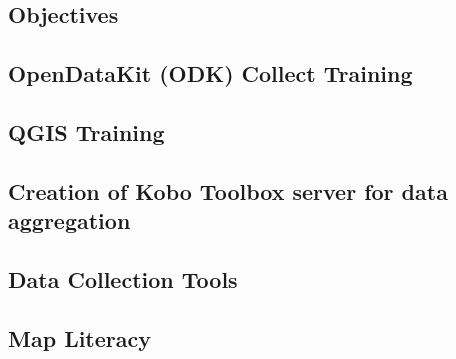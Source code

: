 \documentclass[a4paper,12pt,twoside]{article}
\begin{document}
\begin{multicols}{2}
\lipsum[0-5]
\end{multicols}

\subsection{Objectives}

\begin{multicols}{2}
\lipsum[0-5]
\end{multicols}

\subsection{OpenDataKit (ODK) Collect Training}

\begin{multicols}{2}
\lipsum[0-5]
\end{multicols}

\subsection{QGIS Training}

\begin{multicols}{2}
\lipsum[0-5]
\end{multicols}

\subsection{Creation of Kobo Toolbox  server for data aggregation}

\begin{multicols}{2}
\lipsum[0-5]
\end{multicols}
	
\subsection{Data Collection Tools}

\begin{multicols}{2}
\lipsum[0-5]
\end{multicols}

\subsection{Map Literacy}

\begin{multicols}{2}
\lipsum[0-5]
\end{multicols}
\end{document}
